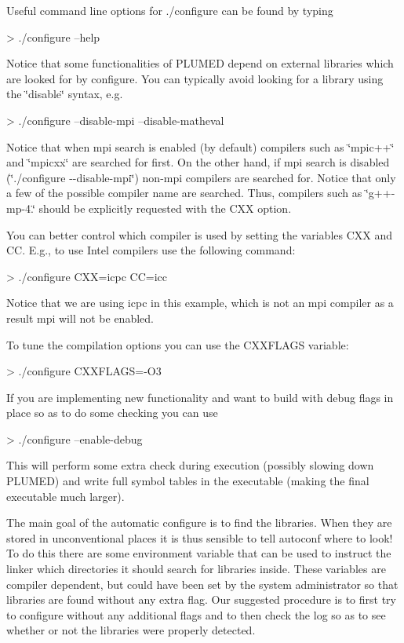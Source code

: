 Useful command line options for ./configure can be found by typing \begin{DoxyVerb}> ./configure --help
\end{DoxyVerb}
 Notice that some functionalities of P\+L\+U\+M\+E\+D depend on external libraries which are looked for by configure. You can typically avoid looking for a library using the \char`\"{}disable\char`\"{} syntax, e.\+g. \begin{DoxyVerb}> ./configure --disable-mpi --disable-matheval
\end{DoxyVerb}


Notice that when mpi search is enabled (by default) compilers such as \char`\"{}mpic++\char`\"{} and \char`\"{}mpicxx\char`\"{} are searched for first. On the other hand, if mpi search is disabled (\char`\"{}./configure -\/-\/disable-\/mpi\char`\"{}) non-\/mpi compilers are searched for. Notice that only a few of the possible compiler name are searched. Thus, compilers such as \char`\"{}g++-\/mp-\/4.\char`\"{} should be explicitly requested with the C\+X\+X option.

You can better control which compiler is used by setting the variables C\+X\+X and C\+C. E.\+g., to use Intel compilers use the following command\+: \begin{DoxyVerb}> ./configure CXX=icpc CC=icc
\end{DoxyVerb}
 Notice that we are using icpc in this example, which is not an mpi compiler as a result mpi will not be enabled.

To tune the compilation options you can use the C\+X\+X\+F\+L\+A\+G\+S variable\+: \begin{DoxyVerb}> ./configure CXXFLAGS=-O3
\end{DoxyVerb}


If you are implementing new functionality and want to build with debug flags in place so as to do some checking you can use \begin{DoxyVerb}> ./configure --enable-debug
\end{DoxyVerb}
 This will perform some extra check during execution (possibly slowing down P\+L\+U\+M\+E\+D) and write full symbol tables in the executable (making the final executable much larger).

The main goal of the automatic configure is to find the libraries. When they are stored in unconventional places it is thus sensible to tell autoconf where to look! To do this there are some environment variable that can be used to instruct the linker which directories it should search for libraries inside. These variables are compiler dependent, but could have been set by the system administrator so that libraries are found without any extra flag. Our suggested procedure is to first try to configure without any additional flags and to then check the log so as to see whether or not the libraries were properly detected.

